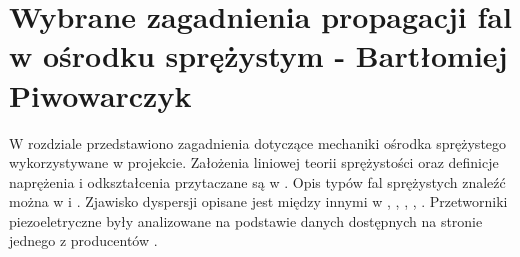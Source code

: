 \chapter{Wybrane zagadnienia propagacji fal w ośrodku sprężystym - Bartłomiej Piwowarczyk}
\label{cha:wybrane_zagadnienia_propagacji_fal_w_osrodku_sprezystym}

W rozdziale przedstawiono zagadnienia dotyczące mechaniki ośrodka sprężystego wykorzystywane w projekcie. Założenia liniowej teorii sprężystości oraz definicje naprężenia i odkształcenia przytaczane są w \cite{bartek_wolny}. Opis typów fal sprężystych znaleźć można w \cite{bartek_rose} i \cite{bartek_nazarchuk}. Zjawisko dyspersji opisane jest między innymi w \cite{bartek_rose}, \cite{bartek_feruza}, \cite{bartek_cervena}, \cite{bartek_tian}, \cite{bartek_valsamos}. Przetworniki piezoeletryczne były analizowane na podstawie danych dostępnych na stronie jednego z producentów \cite{bartek_piezo}.





























